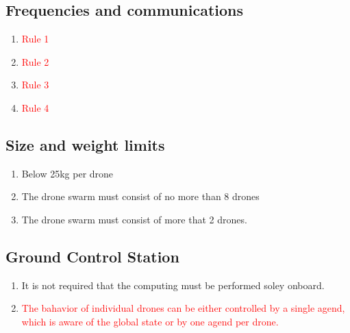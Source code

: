 \subsection{Frequencies and communications}
\begin{enumerate}
	\item{\textcolor{red}{Rule 1}}
	\item{\textcolor{red}{Rule 2}}
	\item{\textcolor{red}{Rule 3}}
	\item{\textcolor{red}{Rule 4}}
\end{enumerate}

\subsection{Size and weight limits}
\begin{enumerate}
	\item{Below 25kg per drone}
	\item{The drone swarm must consist of no more than 8 drones}
	\item{The drone swarm must consist of more that 2 drones.}
\end{enumerate}

\subsection{Ground Control Station}
\begin{enumerate}
	\item{It is not required that the computing must be performed soley onboard.}
	\item{\textcolor{red}{The bahavior of individual drones can be either controlled by a single agend, which is aware of the global state or by one agend per drone.}}
\end{enumerate}